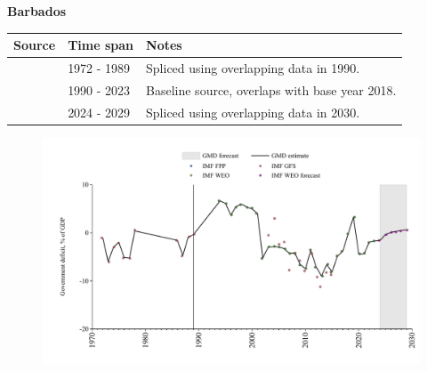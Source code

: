 \documentclass[12pt,a4paper,landscape]{article}
\begin{document}
\begin{adjustbox}{max totalsize={\paperwidth}{\paperheight},center}
\begin{minipage}[t][\textheight][t]{\textwidth}
\vspace*{0.5cm}
{}
\begin{center}
{\Large\bfseries Barbados}
\end{center}
\vspace{0.5cm}
\begin{table}[H]
\centering
\small
\begin{tabular}{|l|l|l|}
\hline
\textbf{Source} & \textbf{Time span} & \textbf{Notes} \\
\hline
\rowcolor{white}\cite{IMF_GFS}& 1972 - 1989 &Spliced using overlapping data in 1990.\\
\rowcolor{lightgray}\cite{IMF_WEO}& 1990 - 2023 &Baseline source, overlaps with base year 2018.\\
\rowcolor{white}\cite{IMF_WEO_forecast}& 2024 - 2029 &Spliced using overlapping data in 2030.\\
\hline
\end{tabular}
\end{table}
\begin{figure}[H]
\centering
\includegraphics[width=\textwidth,height=0.6\textheight,keepaspectratio]{graphs/BRB_govdef_GDP.pdf}
\end{figure}
\end{minipage}
\end{adjustbox}
\end{document}
